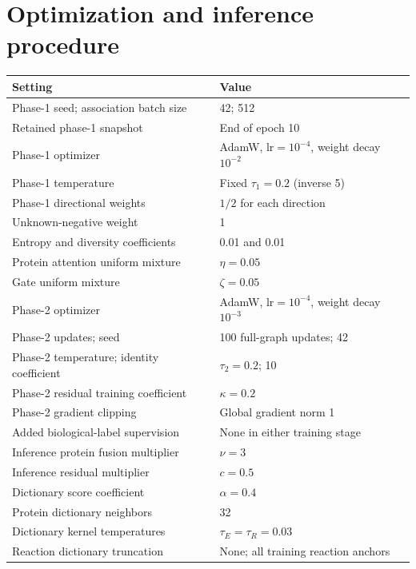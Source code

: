 \section{Optimization and inference procedure}
\label{app:v4-recipe}
\begin{longtable}{p{}p{}}
\toprule
Setting & Value\\
\midrule
\endhead
Phase-1 seed; association batch size & 42; 512\\
Retained phase-1 snapshot & End of epoch 10\\
Phase-1 optimizer & AdamW, $\mathrm{lr}=10^{-4}$, weight decay $10^{-2}$\\
Phase-1 temperature & Fixed $\tau_1=0.2$ (inverse 5)\\
Phase-1 directional weights & $1/2$ for each direction\\
Unknown-negative weight & 1\\
Entropy and diversity coefficients & 0.01 and 0.01\\
Protein attention uniform mixture & $\eta=0.05$\\
Gate uniform mixture & $\zeta=0.05$\\
Phase-2 optimizer & AdamW, $\mathrm{lr}=10^{-4}$, weight decay $10^{-3}$\\
Phase-2 updates; seed & 100 full-graph updates; 42\\
Phase-2 temperature; identity coefficient & $\tau_2=0.2$; 10\\
Phase-2 residual training coefficient & $\kappa=0.2$\\
Phase-2 gradient clipping & Global gradient norm 1\\
Added biological-label supervision & None in either training stage\\
Inference protein fusion multiplier & $\nu=3$\\
Inference residual multiplier & $c=0.5$\\
Dictionary score coefficient & $\alpha=0.4$\\
Protein dictionary neighbors & 32\\
Dictionary kernel temperatures & $\tau_E=\tau_R=0.03$\\
Reaction dictionary truncation & None; all training reaction anchors\\
\bottomrule
\end{longtable}

